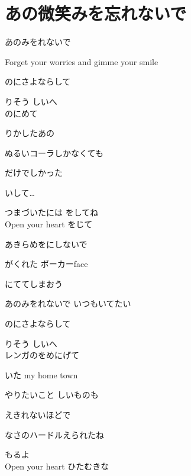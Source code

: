 \section{ あの微笑みを忘れないで}
\large{

あのみをれないで

Forget your worries and gimme your smile

のにさよならして

りそう しいへ
\\

 のにめて

りかしたあの

ぬるいコーラしかなくても

だけでしかった

いして…

つまづいたには をしてね
\\

Open your heart をじて

あきらめをにしないで

がくれた ポーカーface

にててしまおう

あのみをれないで いつもいてたい

のにさよならして

りそう しいへ
\\

レンガのをめにげて

いた my home town

やりたいこと しいものも

えきれないほどで

なさのハードルえられたね

もるよ
\\

Open your heart ひたむきな

}
